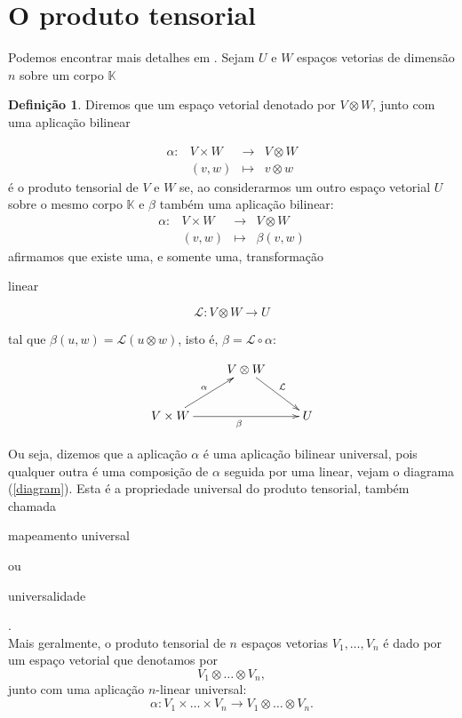 \documentclass[a4paper,11pt]{article}
\theoremstyle{definition}
\newtheorem{definicao}{Definição}[section]
\begin{document}
\section{O produto tensorial}
Podemos encontrar mais detalhes em  \cite{SLang}. Sejam $U$ e $W$ espaços vetorias de dimensão $n$ sobre um corpo $\mathbb{K}$
\begin{definicao}
Diremos que um espaço  vetorial denotado por $V \otimes W$, junto com uma aplicação bilinear

\begin{equation}
\begin{array}{cccc}
\alpha:& V \times W & \longrightarrow & V \otimes W\\
& (v,w) & \mapsto & v \otimes w
\end{array}\nonumber
\end{equation}
é o produto tensorial de $V$ e $W$ se, ao considerarmos um outro espaço vetorial $U$ sobre o mesmo corpo $\mathbb{K}$ e $\beta$ também uma aplicação bilinear:
\begin{equation}\label{beta}
\begin{array}{cccc}
\alpha:& V \times W & \longrightarrow & V \otimes W\\
& (v,w) & \mapsto & \beta (v,w) 
\end{array}
\end{equation}
afirmamos que existe uma, e somente uma, transformação \begin{em} linear \end{em}
$$ 
\mathcal{L}: V \otimes W \rightarrow U
$$

tal que $\beta(u,w) = \mathcal{L}(u\otimes w)$, isto é, $\beta = \mathcal{L}\circ \alpha$:

\begin{equation}\label{diagram}
\begin{gathered}
\xymatrix{
&V \otimes W \ar[rd]^{\mathcal{L}} & \\
V \times W \ar[ur]^{\alpha}  \ar[rr]_{\beta}&&U
}
\end{gathered}
\end{equation}

Ou seja, dizemos que a aplicação $\alpha$ é uma aplicação bilinear universal, pois qualquer outra é uma composição de $\alpha$ seguida por uma linear, vejam o diagrama (\ref{diagram}). Esta é a propriedade universal do produto tensorial, também chamada \begin{em} mapeamento universal \end{em} ou \begin{em} universalidade \end{em}.\\
Mais geralmente, o produto tensorial de $n$ espaços vetorias $ V_1, \dotsc , V_n$ é dado por um espaço vetorial que denotamos por
$$
V_1 \otimes \dotsc \otimes V_n,
$$
junto com uma aplicação $n$-linear universal:
$$
\alpha: V_1 \times \dotsc \times V_n \longrightarrow V_1 \otimes \dotsc \otimes V_n.
$$
\end{definicao}
\end{document}
